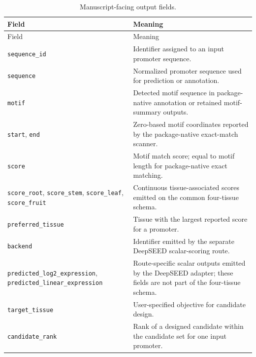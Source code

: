 \documentclass[10pt]{article}
\begin{document}
\begin{longtable}{L{0.22\textwidth}L{0.66\textwidth}}
\caption{Manuscript-facing output fields.}\label{tab:output-fields}\\
\toprule
Field & Meaning \\
\midrule
\endfirsthead
\toprule
Field & Meaning \\
\midrule
\endhead

\texttt{sequence\allowbreak\_id} & Identifier assigned to an input promoter sequence. \\

\texttt{sequence} & Normalized promoter sequence used for prediction or annotation. \\

\texttt{motif} & Detected motif sequence in package-native annotation or retained motif-summary outputs. \\

\texttt{start}, \texttt{end} & Zero-based motif coordinates reported by the package-native exact-match scanner. \\

\texttt{score} & Motif match score; equal to motif length for package-native exact matching. \\

\texttt{score\allowbreak\_root}, \texttt{score\allowbreak\_stem}, \texttt{score\allowbreak\_leaf}, \texttt{score\allowbreak\_fruit} 
& Continuous tissue-associated scores emitted on the common four-tissue schema. \\

\texttt{preferred\allowbreak\_tissue} 
& Tissue with the largest reported score for a promoter. \\

\texttt{backend} 
& Identifier emitted by the separate DeepSEED scalar-scoring route. \\

\texttt{predicted\allowbreak\_log2\allowbreak\_expression}, \texttt{predicted\allowbreak\_linear\allowbreak\_expression} 
& Route-specific scalar outputs emitted by the DeepSEED adapter; these fields are not part of the four-tissue schema. \\

\texttt{target\allowbreak\_tissue} 
& User-specified objective for candidate design. \\

\texttt{candidate\allowbreak\_rank} 
& Rank of a designed candidate within the candidate set for one input promoter. \\


\end{longtable}
\end{document}
